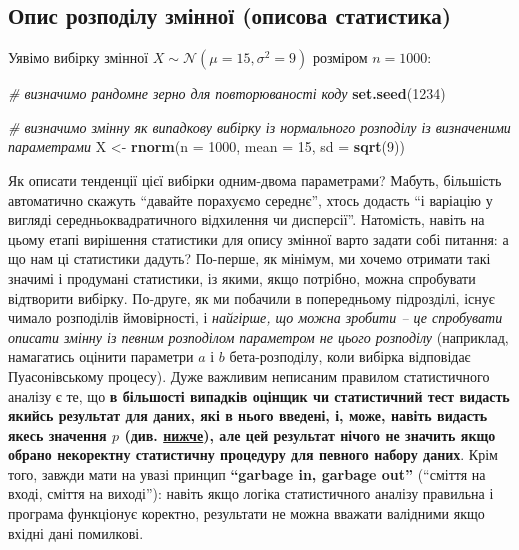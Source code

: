 \documentclass[
  11pt,
]{book}
\newenvironment{Shaded}{\begin{snugshade}}{\end{snugshade}}
\newcommand{\AttributeTok}[1]{\textcolor[rgb]{0.13,0.29,0.53}{#1}}
\newcommand{\CommentTok}[1]{\textcolor[rgb]{0.56,0.35,0.01}{\textit{#1}}}
\newcommand{\DecValTok}[1]{\textcolor[rgb]{0.00,0.00,0.81}{#1}}
\newcommand{\FunctionTok}[1]{\textcolor[rgb]{0.13,0.29,0.53}{\textbf{#1}}}
\newcommand{\NormalTok}[1]{#1}
\newcommand{\OtherTok}[1]{\textcolor[rgb]{0.56,0.35,0.01}{#1}}
\begin{document}
\subsection{Опис розподілу змінної (описова статистика)}\label{bars}

Уявімо вибірку змінної \(X \sim \mathcal{N}(\mu = 15, \sigma^2 = 9)\) розміром \(n = 1000\):

\begin{Shaded}
\begin{Highlighting}[]
\CommentTok{\# визначимо рандомне зерно для повторюваності коду}
\FunctionTok{set.seed}\NormalTok{(}\DecValTok{1234}\NormalTok{)}

\CommentTok{\# визначимо змінну як випадкову вибірку із нормального розподілу із визначеними параметрами}
\NormalTok{X }\OtherTok{\textless{}{-}} \FunctionTok{rnorm}\NormalTok{(}\AttributeTok{n =} \DecValTok{1000}\NormalTok{, }\AttributeTok{mean =} \DecValTok{15}\NormalTok{, }\AttributeTok{sd =} \FunctionTok{sqrt}\NormalTok{(}\DecValTok{9}\NormalTok{))}
\end{Highlighting}
\end{Shaded}

Як описати тенденції цієї вибірки одним-двома параметрами? Мабуть, більшість автоматично скажуть ``давайте порахуємо середнє'', хтось додасть ``і варіацію у вигляді середньоквадратичного відхилення чи дисперсії''. Натомість, навіть на цьому етапі вирішення статистики для опису змінної варто задати собі питання: а що нам ці статистики дадуть? По-перше, як мінімум, ми хочемо отримати такі значимі і продумані статистики, із якими, якщо потрібно, можна спробувати відтворити вибірку. По-друге, як ми побачили в попередньому підрозділі, існує чимало розподілів ймовірності, і \emph{найгірше, що можна зробити -- це спробувати описати змінну із певним розподілом параметром не цього розподілу} (наприклад, намагатись оцінити параметри \(a\) і \(b\) бета-розподілу, коли вибірка відповідає Пуасонівському процесу). Дуже важливим неписаним правилом статистичного аналізу є те, що \textbf{в більшості випадків оцінщик чи статистичний тест видасть якийсь результат для даних, які в нього введені, і, може, навіть видасть якесь значення \(p\) (див. \hyperref[pval]{нижче}), але цей результат нічого не значить якщо обрано некоректну статистичну процедуру для певного набору даних}. Крім того, завжди мати на увазі принцип \textbf{``garbage in, garbage out''} (``сміття на вході, сміття на виході''): навіть якщо логіка статистичного аналізу правильна і програма функціонує коректно, результати не можна вважати валідними якщо вхідні дані помилкові.
\end{document}
